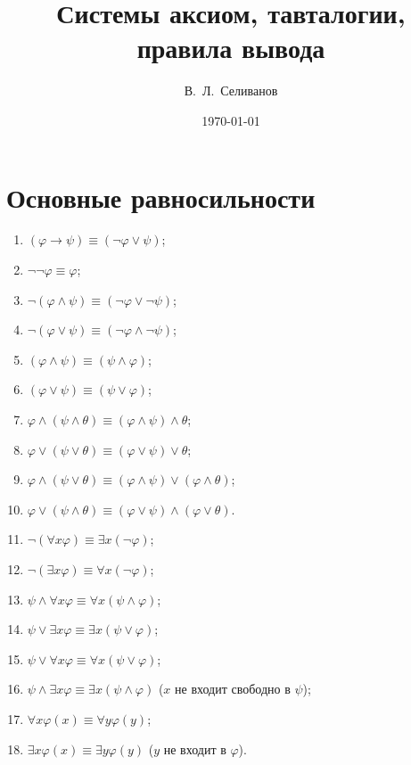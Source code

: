 \documentclass[a4paper,11pt]{article}
\title{Системы аксиом, тавталогии, правила вывода}
\date{\today}
\author{В.~Л.~Селиванов}
\begin{document}
 \maketitle \tableofcontents

\newpage
\section{Основные равносильности}

\begin{enumerate}
\item $(\varphi\rightarrow\psi)\equiv(\neg\varphi\lor\psi)$; 

\item $\neg\neg\varphi\equiv\varphi$;

\item $\neg (\varphi \land \psi)\equiv (\neg\varphi\lor \neg\psi)$;

\item $\neg(\varphi \lor \psi) \equiv(\neg\varphi \land \neg\psi)$;

\item $(\varphi\land\psi) \equiv(\psi \land \varphi)$; 

\item $(\varphi \lor \psi)\equiv(\psi \lor \varphi)$;

\item $\varphi\land(\psi\land\theta)\equiv(\varphi\land\psi)\land\theta$;

\item $\varphi\lor (\psi\lor \theta) \equiv(\varphi \lor \psi) \lor \theta$;

\item $\varphi\land(\psi\lor\theta)\equiv(\varphi\land\psi)\lor(\varphi\land\theta)$; 

\item $\varphi\lor(\psi\land\theta)\equiv(\varphi\lor\psi)\land(\varphi\lor\theta)$.\medskip

\item $\neg(\forall x \varphi)\equiv \exists x (\neg\varphi)$; 

\item $\neg (\exists x \varphi)\equiv \forall x (\neg\varphi)$;

\item $\psi \land \forall x \varphi\equiv \forall x (\psi\land\varphi)$; 

\item $\psi\lor \exists x \varphi \equiv \exists x (\psi \lor \varphi)$;

\item $\psi \lor \forall x \varphi\equiv \forall x (\psi\lor \varphi)$; 

\item $\psi \land\exists x \varphi \equiv\exists x (\psi \land \varphi)$
($x$ не входит свободно в $\psi$);

\item $\forall x \varphi(x) \equiv\forall y \varphi(y)$; 

\item $\exists
x\varphi(x) \equiv \exists y\varphi(y)$
($y$ не входит в $\varphi$).
\end{enumerate}
\end{document}
